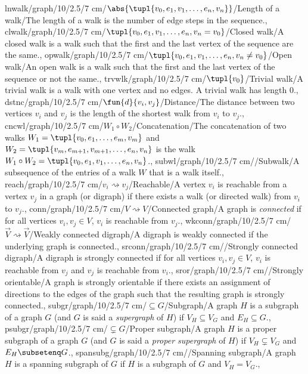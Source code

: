 lnwalk/graph/10/2.5/7 cm/{$\abs{\tupl{v_0,e_1,v_1,\ldots,e_n,v_n}}$}/{Length of a walk}/{The length of a walk is the number of edge steps in the sequence.},
clwalk/graph/10/2.5/7 cm/{$\tupl{v_0,e_1,v_1,\ldots,e_n,v_n=v_0}$}/{Closed walk}/{A closed walk is a walk such that the first and the last vertex of the sequence are the same.},
opwalk/graph/10/2.5/7 cm/{$\tupl{v_0,e_1,v_1,\ldots,e_n,v_n\neq v_0}$}/{Open walk}/{An open walk is a walk such that the first and the last vertex of the sequence or not the same.},
trvwlk/graph/10/2.5/7 cm/{$\tupl{v_0}$}/{Trivial walk}/{A trivial walk is a walk with one vertex and no edges. A trivial walk has length $0$.},
dstnc/graph/10/2.5/7 cm/{$\fun{d}{v_i,v_j}$}/{Distance}/{The distance between two vertices $v_i$ and $v_j$ is the length of the shortest walk from $v_i$ to $v_j$.},
cncwl/graph/10/2.5/7 cm/{$W_1\circ W_2$}/{Concatenation}/{The concatenation of two walks $W_1=\tupl{v_0,e_1,\ldots,e_m,v_m}$ and $W_2=\tupl{v_m,e_{m+1},v_{m+1},\ldots,e_n,v_n}$ is the walk $W_1\circ W_2=\tupl{v_0,e_1,v_1,\ldots,e_n,v_n}$.},
subwl/graph/10/2.5/7 cm/{}/{Subwalk}/{A subsequence of the entries of a walk $W$ that is a walk itself.},
reach/graph/10/2.5/7 cm/{$v_i\rightsquigarrow v_j$}/{Reachable}/{A vertex $v_i$ is reachable from a vertex $v_j$ in a graph (or digraph) if there exists a walk (or directed walk) from $v_i$ to $v_j$.},
conn/graph/10/2.5/7 cm/{$V\rightsquigarrow V$}/{Connected graph}/{A graph is \emph{connected} if for all vertices $v_i,v_j\in V$, $v_i$ is reachable from $v_j$.},
wkconn/graph/10/2.5/7 cm/{$\vec{V}\rightsquigarrow\vec{V}$}/{Weakly connected digraph}/{A digraph is weakly connected if the underlying graph is connected.},
srconn/graph/10/2.5/7 cm/{}/{Strongly connected digraph}/{A digraph is strongly connected if for all vertices $v_i,v_j\in V$, $v_i$ is reachable from $v_j$ and $v_j$ is reachable from $v_i$.},
sror/graph/10/2.5/7 cm/{}/{Strongly orientable}/{A graph is strongly orientable if there exists an assignment of directions to the edges of the graph such that the resulting graph is strongly connected.},
subgr/graph/10/2.5/7 cm/{$\subseteq G$}/{Subgraph}/{A graph $H$ is a subgraph of a graph $G$ (and $G$ is said a \emph{supergraph} of $H$) if $V_H\subseteq V_G$ and $E_H\subseteq G$.},
psubgr/graph/10/2.5/7 cm/{$\subsetneq G$}/{Proper subgraph}/{A graph $H$ is a proper subgraph of a graph $G$ (and $G$ is said a \emph{proper supergraph} of $H$) if $V_H\subsetneq V_G$ and $E_H\subsetenq G$.},
spansubg/graph/10/2.5/7 cm/{}/{Spanning subgraph}/{A graph $H$ is a spanning subgraph of $G$ if $H$ is a subgraph of $G$ and $V_H=V_G$.},

